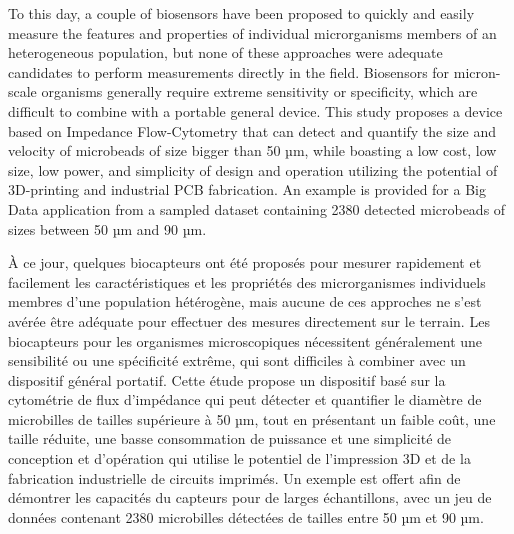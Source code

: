 To this day, a couple of biosensors have been proposed to quickly and easily measure the features and properties of individual microrganisms members of an heterogeneous population, but none of these approaches were adequate candidates to perform measurements directly in the field. Biosensors for micron-scale organisms generally require extreme sensitivity or specificity, which are difficult to combine with a portable general device. This study proposes a device based on Impedance Flow-Cytometry that can detect and quantify the size and velocity of microbeads of size bigger than 50 µm, while boasting a low cost, low size, low power, and simplicity of design and operation utilizing the potential of 3D-printing and industrial PCB fabrication. An example is provided for a Big Data application from a sampled dataset containing 2380 detected microbeads of sizes between 50 µm and 90 µm. 

À ce jour, quelques biocapteurs ont été proposés pour mesurer rapidement et facilement les caractéristiques et les propriétés des microrganismes individuels membres d'une population hétérogène, mais aucune de ces approches ne s'est avérée être adéquate pour effectuer des mesures directement sur le terrain. Les biocapteurs pour les organismes microscopiques nécessitent généralement une sensibilité ou une spécificité extrême, qui sont difficiles à combiner avec un dispositif général portatif. Cette étude propose un dispositif basé sur la cytométrie de flux d'impédance qui peut détecter et quantifier le diamètre de microbilles de tailles supérieure à 50 µm, tout en présentant un faible coût, une taille réduite, une basse consommation de puissance et une simplicité de conception et d'opération qui utilise le potentiel de l'impression 3D et de la fabrication industrielle de circuits imprimés. Un exemple est offert afin de démontrer les capacités du capteurs pour de larges échantillons, avec un jeu de données contenant 2380 microbilles détectées de tailles entre 50 µm et 90 µm. 